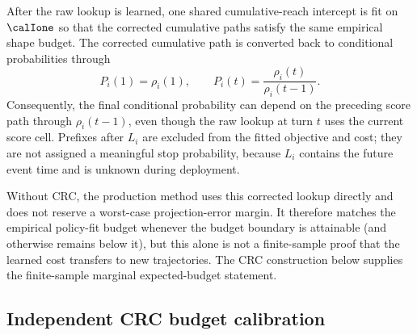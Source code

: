 After the raw lookup is learned, one shared cumulative-reach intercept is fit
on $\calIone$ so that the corrected cumulative paths satisfy the same
empirical shape budget.  The corrected cumulative path is converted back to
conditional probabilities through
\begin{equation}
    P_i(1)=\rho_i(1),
    \qquad P_i(t)=\frac{\rho_i(t)}{\rho_i(t-1)}.
    \label{eq:dapro_lpb_cumulative_to_conditional}
\end{equation}
Consequently, the final conditional probability can depend on the preceding
score path through $\rho_i(t-1)$, even though the raw lookup at turn $t$ uses
the current score cell.  Prefixes after $L_i$ are excluded from the fitted
objective and cost; they are not assigned a meaningful stop probability,
because $L_i$ contains the future event time and is unknown during deployment.

Without CRC, the production method uses this corrected lookup directly and
does not reserve a worst-case projection-error margin.  It therefore matches
the empirical policy-fit budget whenever the budget boundary is attainable
(and otherwise remains below it), but this alone is not a finite-sample proof
that the learned cost transfers to new trajectories.  The CRC construction
below supplies the finite-sample marginal expected-budget statement.

\subsection{Independent CRC budget calibration}
\label{sec:dapro_lpb_crc}

